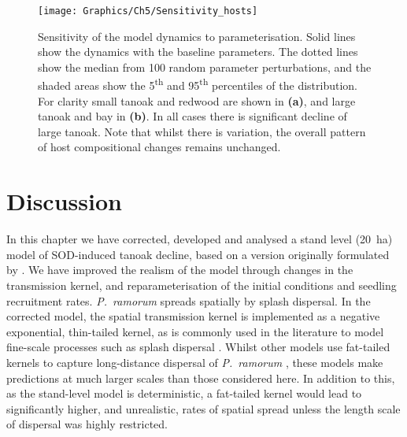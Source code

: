 \begin{figure}
    \begin{center}
        \texttt{[image: Graphics/Ch5/Sensitivity\_hosts]}
        \caption[Sensitivity of model dynamics]{Sensitivity of the model dynamics to parameterisation. Solid lines show the dynamics with the baseline parameters. The dotted lines show the median from 100 random parameter perturbations, and the shaded areas show the 5\textsuperscript{th} and 95\textsuperscript{th} percentiles of the distribution. For clarity small tanoak and redwood are shown in \textbf{(a)}, and large tanoak and bay in \textbf{(b)}. In all cases there is significant decline of large tanoak. Note that whilst there is variation, the overall pattern of host compositional changes remains unchanged.\label{fig:ch5:model_sensitivity}}
    \end{center}
\end{figure}
\FloatBarrier

\section{Discussion\label{sec:ch5:discussion}}

In this chapter we have corrected, developed and analysed a stand level (\SI{20}{\hectare}) model of SOD-induced tanoak decline, based on a version originally formulated by \citet{cobb_ecosystem_2012}. We have improved the realism of the model through changes in the transmission kernel, and reparameterisation of the initial conditions and seedling recruitment rates. \emph{P.~ramorum} spreads spatially by splash dispersal. In the corrected model, the spatial transmission kernel is implemented as a negative exponential, thin-tailed kernel, as is commonly used in the literature to model fine-scale processes such as splash dispersal \citep{skelsey_pest_2013}. Whilst other models use fat-tailed kernels to capture long-distance dispersal of \emph{P.~ramorum} \citep[e.g.][]{meentemeyer_epidemiological_2011,harwood_epidemiological_2009}, these models make predictions at much larger scales than those considered here. In addition to this, as the stand-level model is deterministic, a fat-tailed kernel would lead to significantly higher, and unrealistic, rates of spatial spread unless the length scale of dispersal was highly restricted.

